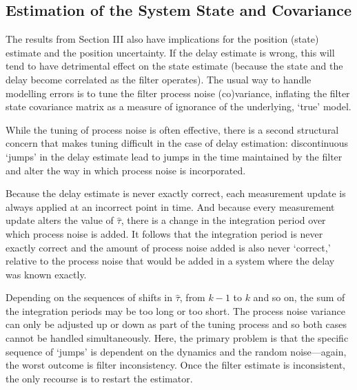 \documentclass[letterpaper,10pt,conference]{ieeeconf}
\theoremstyle{definition}
\begin{document}
\subsection{Estimation of the System State and Covariance}
\label{subsec:state_estimate}

The results from Section III also have implications for the position (state) estimate and the position uncertainty.
%
If the delay estimate is wrong, this will tend to have detrimental effect on the state estimate (because the state and the delay become correlated as the filter operates).
%
The usual way to handle modelling errors is to tune the filter process noise (co)variance, inflating the filter state covariance matrix as a measure of ignorance of the underlying, `true' model. 

While the tuning of process noise is often effective, there is a second structural concern that makes tuning difficult in the case of delay estimation: discontinuous `jumps' in the delay estimate lead to jumps in the time maintained by the filter and alter the way in which process noise is incorporated.

Because the delay estimate is never exactly correct, each measurement update is always applied at an incorrect point in time.
%
And because every measurement update alters the value of $\hat{\tau}$, there is a change in the integration period over which process noise is added.
%
It follows that the integration period is never exactly correct and the amount of process noise added is also never `correct,' relative to the process noise that would be added in a system where the delay was known exactly.

Depending on the sequences of shifts in $\hat{\tau}$, from $k - 1$ to $k$ and so on, the sum of the integration periods may be too long or too short.
% 
The process noise variance can only be adjusted up or down as part of the tuning process and so both cases cannot be handled simultaneously.
%
Here, the primary problem is that the specific sequence of `jumps' is dependent on the dynamics and the random noise---again, the worst outcome is filter inconsistency.
%
Once the filter estimate is inconsistent, the only recourse is to restart the estimator.
\end{document}
